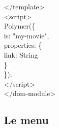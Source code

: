 \documentclass{article}
\begin{document}
{{\hspace*{0.6cm}</template>\\
\hspace*{0.6cm}<script>\\
\hspace*{0.6cm}Polymer(\{\\
\hspace*{1.2cm}is: "my-movie",\\
\hspace*{1.2cm}properties: \{\\
\hspace*{1.8cm}link: String\\
\hspace*{1.2cm}\}\\
\hspace*{0.6cm}\});\\
\hspace*{0.6cm}</script>\\
</dom-module>
}}
\vspace{0.5cm}\\

\subsection{Le menu}
\end{document}
